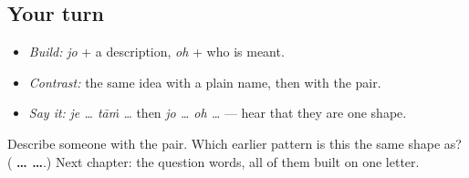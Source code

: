 \subsection*{Your turn}
\begin{itemize}
\raggedright
  \item \emph{Build:} \emph{jo} + a description, \emph{oh} + who is meant.
  \item \emph{Contrast:} the same idea with a plain name, then with the pair.
  \item \emph{Say it:} \emph{je … tāṁ …} then \emph{jo … oh …} — hear that they are one shape.
\end{itemize}

\begin{tcolorbox}[breakable,colback=teal!4,colframe=teal!35!black,title={Before you move on}]
Describe someone with the pair. Which earlier pattern is this the same shape as? (\textbf{ …  …}.) Next chapter: the question words, all of them built on one letter.
\end{tcolorbox}
